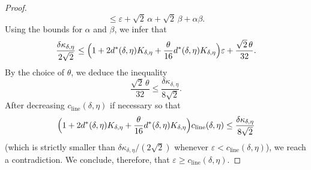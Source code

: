 \documentclass[11pt]{amsart}
\numberwithin{equation}{section}
\theoremstyle{definition}
\theoremstyle{remark}
\newcommand{\eps}{\varepsilon}
\begin{document}
\begin{proof}
\[	\le
	\eps+\sqrt2\,\alpha+\sqrt2\,\beta+\alpha\beta.
	\]
	Using the bounds for $\alpha$ and $\beta$, we infer that
	\[
	\frac{\delta\kappa_{\delta,\eta}}{2\sqrt2}
	\le
	\Bigl(1+2d^*(\delta,\eta)K_{\delta,\eta}
	+\frac{\theta}{16}d^*(\delta,\eta)K_{\delta,\eta}\Bigr)\eps
	+\frac{\sqrt2\,\theta}{32}.
	\]
	By the choice of $\theta$, we deduce the inequality
	\[
	\frac{\sqrt2\,\theta}{32}
	\le \frac{\delta\kappa_{\delta,\eta}}{8\sqrt2}.
	\]
	After decreasing $c_{\mathrm{line}}(\delta,\eta)$ if necessary so that
	\[
	\Bigl(1+2d^*(\delta,\eta)K_{\delta,\eta}
	+\frac{\theta}{16}d^*(\delta,\eta)K_{\delta,\eta}\Bigr)
	c_{\mathrm{line}}(\delta,\eta)
	\le \frac{\delta\kappa_{\delta,\eta}}{8\sqrt2}
	\]
	(which is strictly smaller than
$\delta\kappa_{\delta,\eta}/(2\sqrt2)$ whenever
	$\eps<c_{\mathrm{line}}(\delta,\eta)$), we reach a contradiction. We conclude, therefore, that
	$\eps\ge c_{\mathrm{line}}(\delta,\eta)$.
\vspace{0.5em}


\end{proof}
\end{document}
